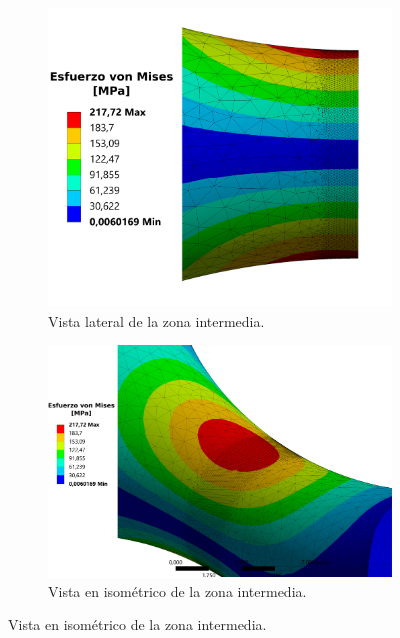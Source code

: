 \begin{figure}[p]
\centering
	\begin{subfigure}{0.8\linewidth}
		\centering
		\includegraphics[width=0.9\linewidth]{Imagenes/esfvm_lat.pdf}
		\caption{Vista lateral de la zona intermedia.}
		\label{fig:corte_lat201}
	\end{subfigure}
	\begin{subfigure}{0.9\linewidth}
		\centering
		\includegraphics[width=\linewidth]{Imagenes/esfvm_iso.pdf}
		\caption{Vista en isométrico de la zona intermedia.}
		\label{fig:iso201}
	\end{subfigure}
\end{figure}
